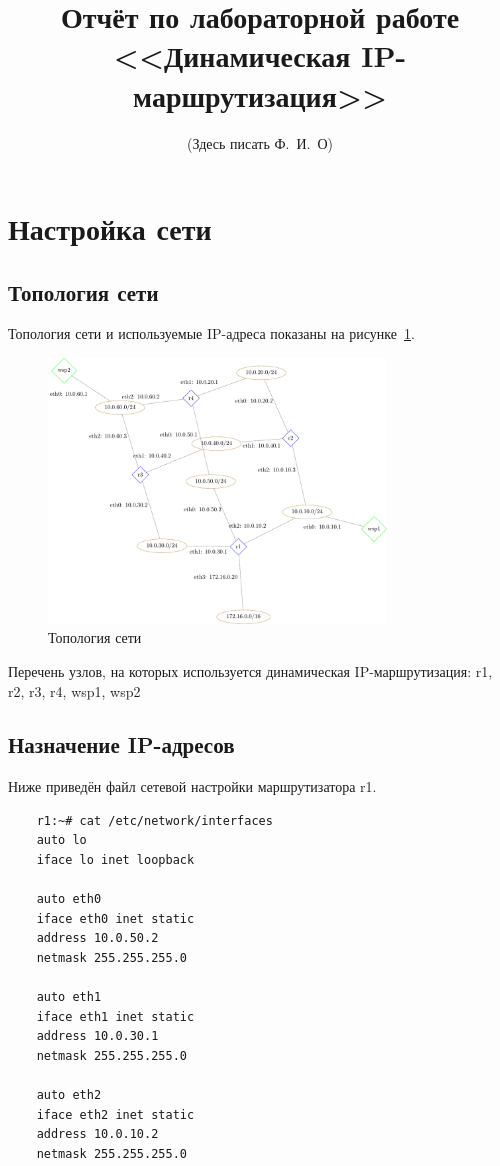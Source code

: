 \documentclass[a4paper,12pt]{article}
\title{Отчёт по лабораторной работе \\ <<Динамическая IP-маршрутизация>>}
\author{(Здесь писать Ф.~И.~О)}
\begin{document}
\maketitle

\tableofcontents

\section{Настройка сети}

\subsection{Топология сети}

Топология сети и используемые IP-адреса показаны на рисунке~\ref{fig:network}.

\begin{figure}
\centering
\includegraphics[width=0.8\textwidth]{includes/network_gv.pdf}
\caption{Топология сети}
\label{fig:network}
\end{figure}

Перечень узлов, на которых используется динамическая IP-маршрутизация:
r1, r2, r3, r4, wsp1, wsp2


\subsection{Назначение IP-адресов}

Ниже приведён файл сетевой настройки  маршрутизатора r1.

\begin{Verbatim}
    r1:~# cat /etc/network/interfaces 
    auto lo
    iface lo inet loopback
    
    auto eth0
    iface eth0 inet static
    address 10.0.50.2
    netmask 255.255.255.0
    
    auto eth1
    iface eth1 inet static
    address 10.0.30.1
    netmask 255.255.255.0
    
    auto eth2
    iface eth2 inet static
    address 10.0.10.2
    netmask 255.255.255.0
    
\end{Verbatim}
\end{document}
